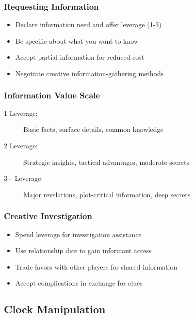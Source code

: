 \subsubsection{Requesting Information}

\begin{itemize}
\item Declare information need and offer leverage (1-3)
\item Be specific about what you want to know
\item Accept partial information for reduced cost
\item Negotiate creative information-gathering methods
\end{itemize}

\subsubsection{Information Value Scale}

\begin{description}
\item[1 Leverage:] Basic facts, surface details, common knowledge
\item[2 Leverage:] Strategic insights, tactical advantages, moderate secrets
\item[3+ Leverage:] Major revelations, plot-critical information, deep secrets
\end{description}

\subsubsection{Creative Investigation}

\begin{itemize}
\item Spend leverage for investigation assistance
\item Use relationship dice to gain informant access
\item Trade favors with other players for shared information
\item Accept complications in exchange for clues
\end{itemize}

\subsection{Clock Manipulation}

